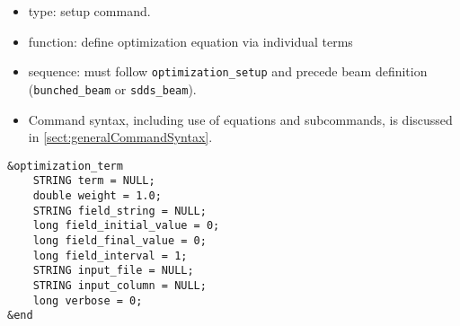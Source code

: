 \documentclass[11pt]{article}
\begin{document}
\begin{itemize}
\item type: setup command.
\item function: define optimization equation via individual terms
\item sequence: must follow \verb|optimization_setup| and precede beam definition (\verb|bunched_beam| or \verb|sdds_beam|).
\item Command syntax, including use of equations and subcommands, is discussed in \ref{sect:generalCommandSyntax}.
\end{itemize}

\begin{verbatim}
&optimization_term
    STRING term = NULL;
    double weight = 1.0;
    STRING field_string = NULL;
    long field_initial_value = 0;
    long field_final_value = 0;
    long field_interval = 1;
    STRING input_file = NULL;
    STRING input_column = NULL;
    long verbose = 0;
&end
\end{verbatim}
\end{document}
